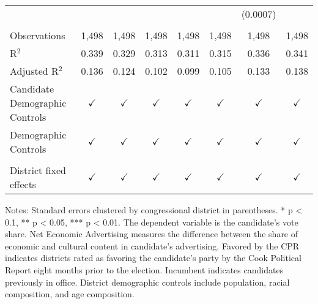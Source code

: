 \begin{table}[htbp]
\begin{tabular}{lccccccc}
                                     &               &               &               &               &                & (0.0007)       &   \\   
       \\
      Observations                   & 1,498         & 1,498         & 1,498         & 1,498         & 1,498          & 1,498          & 1,498\\  
      R$^2$                          & 0.339         & 0.329         & 0.313         & 0.311         & 0.315          & 0.336          & 0.341\\  
      Adjusted R$^2$                 & 0.136         & 0.124         & 0.102         & 0.099         & 0.105          & 0.133          & 0.138\\  
      Candidate Demographic Controls & $\checkmark$  & $\checkmark$  & $\checkmark$  & $\checkmark$  & $\checkmark$   & $\checkmark$   & $\checkmark$\\   
      Demographic Controls           & $\checkmark$  & $\checkmark$  & $\checkmark$  & $\checkmark$  & $\checkmark$   & $\checkmark$   & $\checkmark$\\   
       \\
      District fixed effects         & $\checkmark$  & $\checkmark$  & $\checkmark$  & $\checkmark$  & $\checkmark$   & $\checkmark$   & $\checkmark$\\   
      \bottomrule
   \end{tabular}
   
   \par \raggedright 
   \footnotesize Notes: Standard errors clustered by congressional district in parentheses. * p < 0.1, ** p < 0.05, *** p < 0.01. The dependent variable is the candidate's vote share. Net Economic Advertising measures the difference between the share of economic and cultural content in candidate's advertising. Favored by the CPR indicates districts rated as favoring the candidate's party by the Cook Political Report eight months prior to the election. Incumbent indicates candidates previously in office. District demographic controls include population, racial composition, and age composition.
\end{table}


